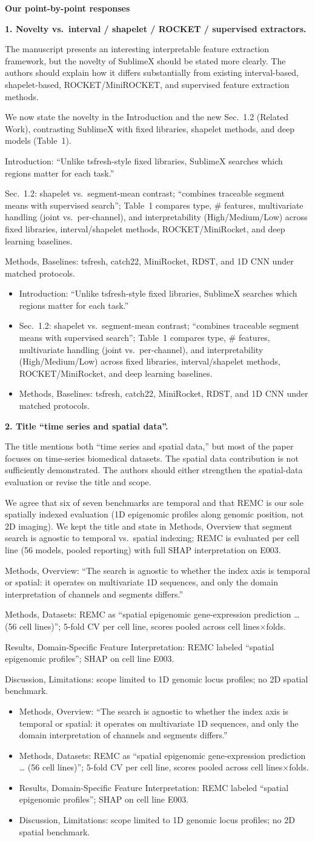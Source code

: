 \documentclass[11pt]{article}
\makeatletter
\newcommand{\rsp}{\par\vspace{0.9em}}
\newcommand{\rcitem}[2]{\begin{reviewerbox}\textbf{#1}\par\smallskip#2\end{reviewerbox}}
\newcommand{\response}[2]{%
  \begin{responsebox}#1%
  \def\@responseitems{#2}%
  \ifx\@responseitems\empty\else\begin{itemize}[nosep,leftmargin=1.2em]#2\end{itemize}\fi
  \end{responsebox}\rsp}
\makeatother
\begin{document}
\medskip\noindent\textbf{Our point-by-point responses}

\rcitem{1. Novelty vs.\ interval / shapelet / ROCKET / supervised extractors.}{The manuscript
presents an interesting interpretable feature extraction framework, but the novelty of SublimeX
should be stated more clearly. The authors should explain how it differs substantially from
existing interval-based, shapelet-based, ROCKET/MiniROCKET, and supervised feature extraction
methods.}

\response{We now state the novelty in the Introduction and the new Sec.~1.2 (Related Work),
contrasting SublimeX with fixed libraries, shapelet methods, and deep models (Table~1).}{
  \item Introduction: ``Unlike tsfresh-style fixed libraries, SublimeX searches which regions
    matter for each task.''
  \item Sec.~1.2: shapelet vs.\ segment-mean contrast; ``combines traceable segment means with
    supervised search''; Table~1 compares type, \# features, multivariate handling (joint vs.\
    per-channel), and interpretability (High/Medium/Low) across fixed libraries, interval/shapelet
    methods, ROCKET/MiniRocket, and deep learning baselines.
  \item Methods, Baselines: tsfresh, catch22, MiniRocket, RDST, and 1D CNN under matched protocols.
}

\rcitem{2. Title ``time series and spatial data''.}{The title mentions both ``time series and
spatial data,'' but most of the paper focuses on time-series biomedical datasets. The spatial data
contribution is not sufficiently demonstrated. The authors should either strengthen the spatial-data
evaluation or revise the title and scope.}

\response{We agree that six of seven benchmarks are temporal and that REMC is our sole spatially
indexed evaluation (1D epigenomic profiles along genomic position, not 2D imaging). We kept the
title and state in Methods, Overview that segment search is agnostic to temporal vs.\ spatial
indexing; REMC is evaluated per cell line (56 models, pooled reporting) with full SHAP
interpretation on E003.}{
  \item Methods, Overview: ``The search is agnostic to whether the index axis is temporal or
    spatial: it operates on multivariate 1D sequences, and only the domain interpretation of
    channels and segments differs.''
  \item Methods, Datasets: REMC as ``spatial epigenomic gene-expression prediction \ldots{}
    (56 cell lines)''; 5-fold CV per cell line, scores pooled across cell lines$\times$folds.
  \item Results, Domain-Specific Feature Interpretation: REMC labeled ``spatial epigenomic
    profiles''; SHAP on cell line E003.
  \item Discussion, Limitations: scope limited to 1D genomic locus profiles; no 2D spatial benchmark.
}
\end{document}
